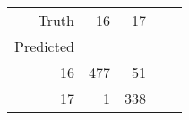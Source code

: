 \begin{table}[h]
\centering
\label{table:5}
\begin{tabular}{rrrrr}
\toprule
Truth & 16 & 17 \\
Predicted &  &  \\
\midrule
16 & 477 & 51 \\
17 & 1 & 338 \\
\bottomrule
\end{tabular}
\end{table}
